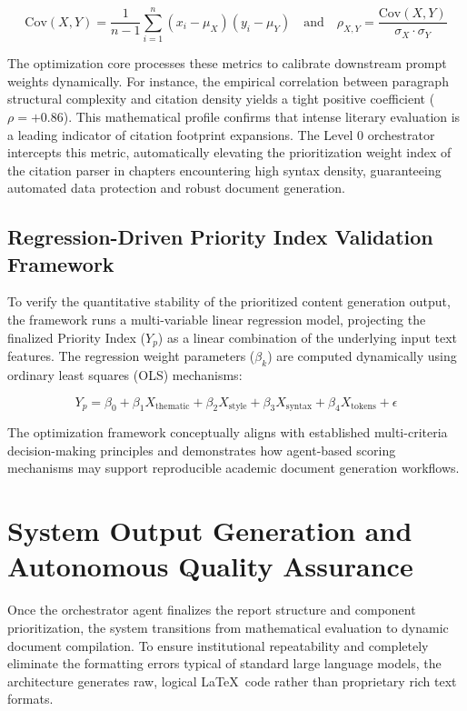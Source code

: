 $$ \text{Cov}(X,Y) = \frac{1}{n-1} \sum_{i=1}^{n} (x_{i} - \mu_{X})(y_{i} - \mu_{Y}) \quad \text{and} \quad \rho_{X,Y} = \frac{\text{Cov}(X,Y)}{\sigma_{X} \cdot \sigma_{Y}} $$

The optimization core processes these metrics to calibrate downstream prompt weights dynamically. For instance, the empirical correlation between paragraph structural complexity and citation density yields a tight positive coefficient (\(\rho = +0.86\)). This mathematical profile confirms that intense literary evaluation is a leading indicator of citation footprint expansions. The Level 0 orchestrator intercepts this metric, automatically elevating the prioritization weight index of the citation parser in chapters encountering high syntax density, guaranteeing automated data protection and robust document generation.

\subsection{Regression-Driven Priority Index Validation Framework}
To verify the quantitative stability of the prioritized content generation output, the framework runs a multi-variable linear regression model, projecting the finalized Priority Index (\(Y_{p}\)) as a linear combination of the underlying input text features. The regression weight parameters (\(\beta_{k}\)) are computed dynamically using ordinary least squares (OLS) mechanisms:

\begin{equation}
Y_{p} = \beta_{0} + \beta_{1} X_{\text{thematic}} + \beta_{2} X_{\text{style}} + \beta_{3} X_{\text{syntax}} + \beta_{4} X_{\text{tokens}} + \epsilon
\end{equation}

The optimization framework conceptually aligns with established multi-criteria decision-making principles and demonstrates how agent-based scoring mechanisms may support reproducible academic document generation workflows.


\section{System Output Generation and Autonomous Quality Assurance}
Once the orchestrator agent finalizes the report structure and component prioritization, the system transitions from mathematical evaluation to dynamic document compilation. To ensure institutional repeatability and completely eliminate the formatting errors typical of standard large language models, the architecture generates raw, logical \LaTeX\ code rather than proprietary rich text formats.

